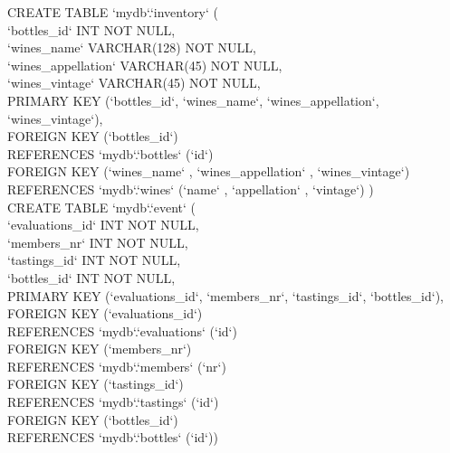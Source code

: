\documentclass{article}
\theoremstyle{remark}
\numberwithin{equation}{section}
\begin{document}
\newpage\noindent CREATE TABLE `mydb`.`inventory` (\\
\indent`bottles\_id` INT NOT NULL,\\
\indent`wines\_name` VARCHAR(128) NOT NULL,\\
\indent`wines\_appellation` VARCHAR(45) NOT NULL,\\
\indent`wines\_vintage` VARCHAR(45) NOT NULL,\\
\indent PRIMARY KEY (`bottles\_id`, `wines\_name`, `wines\_appellation`, `wines\_vintage`),\\
\indent FOREIGN KEY (`bottles\_id`)\\
\indent\indent REFERENCES `mydb`.`bottles` (`id`)\\
\indent FOREIGN KEY (`wines\_name` , `wines\_appellation` , `wines\_vintage`)\\
\indent\indent REFERENCES `mydb`.`wines` (`name` , `appellation` , `vintage`) )\\
CREATE TABLE `mydb`.`event` (\\
\indent`evaluations\_id` INT NOT NULL,\\
\indent`members\_nr` INT NOT NULL,\\
\indent`tastings\_id` INT NOT NULL,\\
\indent`bottles\_id` INT NOT NULL,\\
\indent PRIMARY KEY (`evaluations\_id`, `members\_nr`, `tastings\_id`, `bottles\_id`),\\
\indent FOREIGN KEY (`evaluations\_id`)\\
\indent\indent REFERENCES `mydb`.`evaluations` (`id`)\\
\indent FOREIGN KEY (`members\_nr`)\\
\indent\indent REFERENCES `mydb`.`members` (`nr`)\\
\indent FOREIGN KEY (`tastings\_id`)\\
\indent\indent REFERENCES `mydb`.`tastings` (`id`)\\
\indent FOREIGN KEY (`bottles\_id`)\\
\indent\indent REFERENCES `mydb`.`bottles` (`id`))
\end{document}

